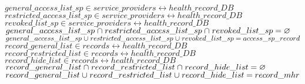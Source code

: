\documentclass[10pt,a4paper]{report}
\begin{document}
$general\_access\_list\_sp \in{} service\_providers \rel{}  health\_record\_DB$
$restricted\_access\_list\_sp \in{} service\_providers \rel{}  health\_record\_DB$
$revoked\_list\_sp \in{} service\_providers \rel{}  health\_record\_DB$
$general\_access\_list\_sp \mathbin{\mkern1mu\cap\mkern1mu}{} restricted\_access\_list\_sp \mathbin{\mkern1mu\cap\mkern1mu}{} revoked\_list\_sp = \mathord\varnothing{}$
$general\_access\_list\_sp \mathbin{\mkern1mu\cup\mkern1mu}{} restricted\_access\_list\_sp \mathbin{\mkern1mu\cup\mkern1mu}{} revoked\_list\_sp = access\_sp\_record$
$record\_general\_list \in{} records \rel{} health\_record\_DB$
$record\_restricted\_list \in{} records \rel{} health\_record\_DB$
$record\_hide\_list \in{} records \rel{} health\_record\_DB$
$record\_general\_list \mathbin{\mkern1mu\cap\mkern1mu}{} record\_restricted\_list \mathbin{\mkern1mu\cap\mkern1mu}{} record\_hide\_list = \mathord\varnothing{}$
$record\_general\_list \mathbin{\mkern1mu\cup\mkern1mu}{} record\_restricted\_list \mathbin{\mkern1mu\cup\mkern1mu}{} record\_hide\_list = record\_mhr$
\end{document}
